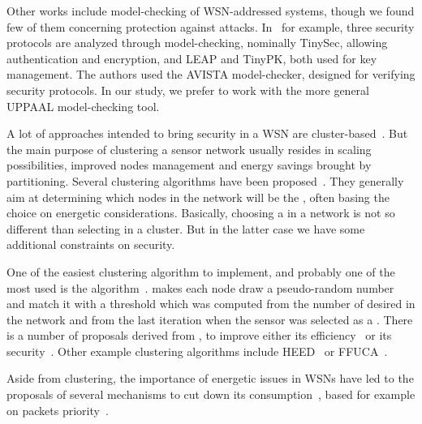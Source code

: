 Other works include model-checking of WSN-addressed systems, though we found few of them concerning protection against \DoS attacks.
In~\cite{TCCDC09} for example, three security protocols are analyzed through model-checking, nominally TinySec, allowing authentication and encryption, and LEAP and TinyPK, both used for key management. 
The authors used the AVISTA model-checker, designed for verifying security protocols.
In our study, we prefer to work with the more general UPPAAL model-checking tool.


\bigskip


A lot of approaches intended to bring security in a WSN are cluster-based~\cite{GD14}.
But the main purpose of clustering a sensor network usually resides in scaling possibilities, improved nodes management and energy savings brought by partitioning.
Several clustering algorithms have been proposed~\cite{AY07}.
They generally aim at determining which nodes in the network will be the \chs, often basing the choice on energetic considerations.
Basically, choosing a \ch in a network is not so different than selecting \cns in a cluster.
But in the latter case we have some additional constraints on security.

One of the easiest clustering algorithm to implement, and probably one of the most used is the \leach algorithm~\cite{HHT02}.
\leach makes each node draw a pseudo-random number and match it with a threshold which was computed from the number of desired \chs in the network and from the last iteration when the sensor was selected as a \CH.
There is a number of proposals derived from \leach, to improve either its efficiency~\cite{RR13,CJ14} or its security~\cite{OFVWBDL07}.
Other example clustering algorithms include HEED~\cite{YF04} or FFUCA~\cite{FMMMI12}.

Aside from clustering, the importance of energetic issues in WSNs have led to the proposals of several mechanisms to cut down its consumption~\cite{ACFP09}, based for example on packets priority~\cite{SAS14}.

\bigskip
{}\\

